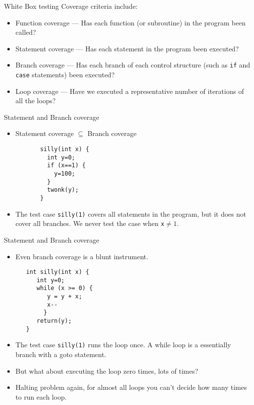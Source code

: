 \documentclass[handout]{beamer}
\begin{document}
\begin{frame}{White Box testing}
Coverage criteria include:
  \begin{itemize}
  \item Function coverage --- Has each function (or subroutine) in the
    program been called?
  \item Statement coverage --- Has each statement in the program been
    executed?  
  \item Branch coverage --- Has each branch of each control structure
    (such as {\tt if} and {\tt case} statements) been executed?
  \item Loop coverage --- Have we executed a representative number of iterations
    of all the loops? 
  \end{itemize}
\end{frame}

\begin{frame}[fragile]{Statement and Branch coverage}

\begin{itemize}
\item Statement coverage $\subseteq$ Branch coverage
\begin{lstlisting}
       silly(int x) {
         int y=0;
         if (x==1) {
           y=100;
         }
         twonk(y);
       }
\end{lstlisting}

  \item  The test case {\tt silly(1)} covers all statements in the program, but
  it does not cover all branches. We never test the case when {\tt x}$\neq1$.
\end{itemize}
\end{frame}

\begin{frame}[fragile]{Statement and Branch coverage}
\begin{itemize}
 \item Even branch coverage is a blunt instrument.
\begin{lstlisting}
   int silly(int x) { 
      int y=0;
      while (x >= 0) {
         y = y + x;
         x--
        }
      return(y);
   }
\end{lstlisting}
  \item The test case {\tt silly(1)} runs the loop once. A while loop is a
    essentially branch with a goto statement. 
  \item But what about executing the loop zero times, lots of times?
   \item Halting problem again, for almost all loops you can't
     decide how many times to run each loop.
\end{itemize}
    
\end{frame}
\end{document}
